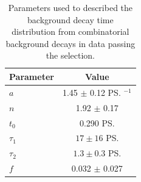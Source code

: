 {\begin{table}[tbp]
\begin{center}
\begin{tabular}{lc}
\hline
Parameter & Value \\
\hline
$a$ & 1.45 $\pm$ 0.12 \ps$^{-1}$\\
$n$ & 1.92 $\pm$ 0.17 \\
$t_{0}$ & 0.290 \ps \\
$\tau_{1}$ & $17 \pm 16$ \ps \\ 
$\tau_{2}$ & $1.3 \pm 0.3$ \ps \\
$f$ & 0.032 $\pm$ 0.027 \\
\hline
\end{tabular}
\vspace{0.7cm}             
\caption{Parameters used to described the background decay time distribution from combinatorial background decays in data passing the \bhh selection.}
\label{tab:bkgparams}
\end{center}
\vspace{-1.0cm}                                                                                                                                               
\end{table}

}
